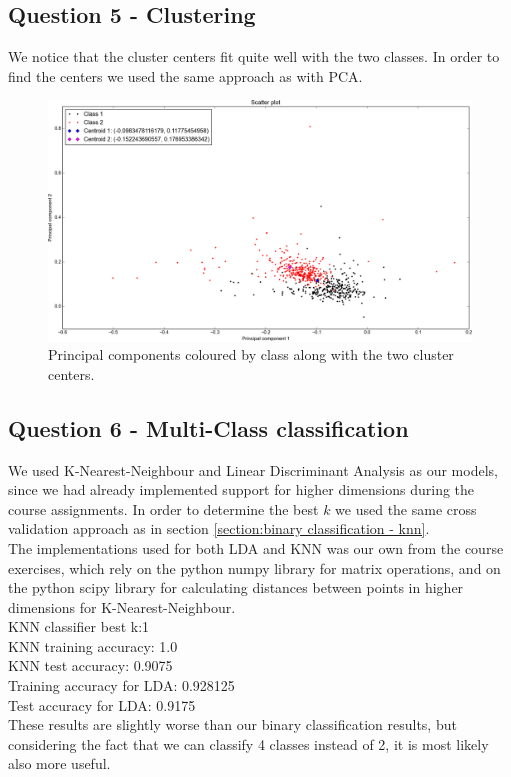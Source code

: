 \documentclass[12pt]{article}
\begin{document}
\newpage

\subsection{Question 5 - Clustering}

We notice that the cluster centers fit quite well with the two classes. In order to find the centers we used the same approach as with PCA.

\begin{figure}[H]
	\includegraphics[scale=0.45]{principal_component_analysis_centroids.png}
	\caption{Principal components coloured by class along with the two cluster centers.}
	\label{fig:svr_linear_regression}
\end{figure}

\newpage

\subsection{Question 6 - Multi-Class classification}

We used K-Nearest-Neighbour and Linear Discriminant Analysis as our models, since we had already implemented support for higher dimensions during the course assignments.
In order to determine the best $k$ we used the same cross validation approach as in section \ref{section:binary classification - knn}.\\

\noindent The implementations used for both LDA and KNN was our own from the course exercises, which rely on the python numpy library for matrix operations, and on the python scipy library for calculating distances between points in higher dimensions for K-Nearest-Neighbour.\\

\noindent KNN classifier best k:1 \\
KNN training accuracy: 1.0 \\
KNN test accuracy: 0.9075 \\

\noindent Training accuracy for LDA: 0.928125 \\
Test accuracy for LDA: 0.9175 \\

\noindent These results are slightly worse than our binary classification results, but considering the fact that we can classify 4 classes instead of 2, it is most likely also more useful. 
\end{document}
